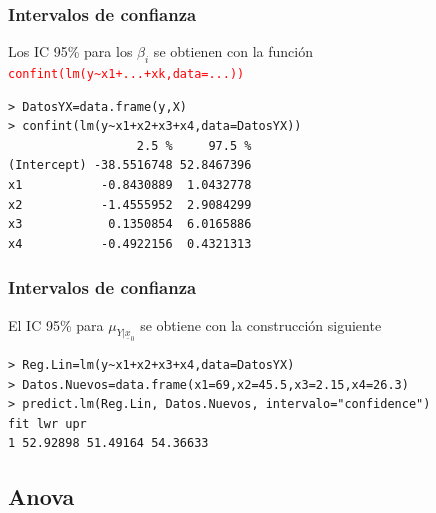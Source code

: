 \documentclass[12pt,t]{beamer}
\newcommand{\red}[1]{\textcolor{red}{#1}}
\theoremstyle{plain}
\theoremstyle{definition}
\begin{document}
\begin{frame}[fragile]
\frametitle{Intervalos de confianza}
Los IC 95\% para los $\beta_i$ se obtienen con la función \red{\tt confint(lm(y\~{}x1+...+xk,data=...))}\medskip

\begin{lstlisting}
> DatosYX=data.frame(y,X)
> confint(lm(y~x1+x2+x3+x4,data=DatosYX))
                  2.5 %     97.5 %
(Intercept) -38.5516748 52.8467396
x1           -0.8430889  1.0432778
x2           -1.4555952  2.9084299
x3            0.1350854  6.0165886
x4           -0.4922156  0.4321313
\end{lstlisting}
%
%
\end{frame}



\begin{frame}[fragile]
\frametitle{Intervalos de confianza}
El IC 95\% para $\mu_{Y|\underline{x}_0}$ se obtiene con la construcción siguiente\medskip

\begin{lstlisting}
> Reg.Lin=lm(y~x1+x2+x3+x4,data=DatosYX)
> Datos.Nuevos=data.frame(x1=69,x2=45.5,x3=2.15,x4=26.3)
> predict.lm(Reg.Lin, Datos.Nuevos, intervalo="confidence")
fit lwr upr
1 52.92898 51.49164 54.36633
\end{lstlisting}

\end{frame}




\subsection{Anova}
\end{document}
